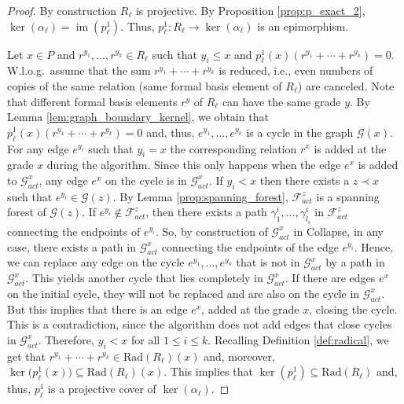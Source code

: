 \documentclass[english,a4paper,nolineno,cleveref]{socg-lipics-v2021}
\DeclareMathOperator{\im}{im}
\begin{document}
\begin{proof}
By construction $R_\ell$ is projective. By Proposition \ref{prop:p_exact_2}, $\ker(\alpha_\ell)=\im(p_\ell^1)$. Thus, $p_\ell^1\colon R_\ell\rightarrow \ker(\alpha_\ell)$ is an epimorphism. 

Let $x\in P$ and $r^{y_1},\ldots, r^{y_k}\in R_\ell$ such that $y_i\leq x$ and $p_\ell^1(x)(r^{y_1}+\cdots+r^{y_k})=0$. W.l.o.g.\ assume that the sum $r^{y_1}+\cdots+r^{y_k}$ is reduced, i.e., even numbers of copies of the same relation (same formal basis element of $R_\ell$) are canceled. Note that different formal basis elements $r^y$ of $R_\ell$ can have the same grade $y$. By Lemma \ref{lem:graph_boundary_kernel}, we obtain that $\overline{p}_\ell^1(x)(r^{y_1}+\cdots+r^{y_k}) =0$
and, thus, $e^{y_1},\ldots,e^{y_k}$ is a cycle in the graph $\mathcal{G}(x)$. For any edge $e^{y_i}$ such that $y_i=x$ the corresponding relation $r^x$ is added at the grade $x$ during the algorithm. Since this only happens when the edge $e^x$ is added to $\mathcal{G}_{act}^x$, any edge $e^x$ on the cycle is in $\mathcal{G}_{act}^x$. If $y_i<x$ then there exists a $z\prec x$ such that $e^{y_i}\in\mathcal{G}(z)$. By Lemma \ref{prop:spanning_forest}, $\mathcal{F}_{act}^z$ is a spanning forest of $\mathcal{G}(z)$. If $e^{y_i}\notin\mathcal{F}_{act}^z$, then there exists a path $\gamma_1^{i},\ldots,\gamma^{i}_{l_i}$ in $\mathcal{F}_{act}^z$ connecting the endpoints of $e^{y_i}$. So, by construction of $\mathcal{G}_{act}^x$ in {\sc Collapse}, in any case, there exists a path in $\mathcal{G}_{act}^x$ connecting the endpoints of the edge $e^{y_i}$. Hence, we can replace any edge on the cycle $e^{y_1},\ldots,e^{y_k}$ that is not in $\mathcal{G}_{act}^x$ by a path in $\mathcal{G}_{act}^x$. This yields another cycle that lies completely in $\mathcal{G}_{act}^x$. If there are edges $e^x$ on the initial cycle, they will not be replaced and are also on the cycle in $\mathcal{G}_{act}^x$. But this implies that there is an edge $e^x$, added at the grade $x$, closing the cycle. This is a contradiction, since the algorithm does not add edges that close cycles in $\mathcal{G}_{act}^x$. Therefore, $y_i<x$ for all $1\leq i\leq k$. Recalling Definition \ref{def:radical}, we get that $r^{y_1}+\cdots+r^{y_k}\in \mathrm{Rad}(R_\ell)(x)$ and, moreover, $\ker\!\big(p_\ell^1(x)\big)\subseteq \mathrm{Rad}(R_\ell)(x)$. This implies that $\ker(p_\ell^1)\subseteq \mathrm{Rad}(R_\ell)$ and, thus, $p^1_\ell$ is a projective cover of $\ker(\alpha_\ell)$.
\end{proof}
\end{document}
